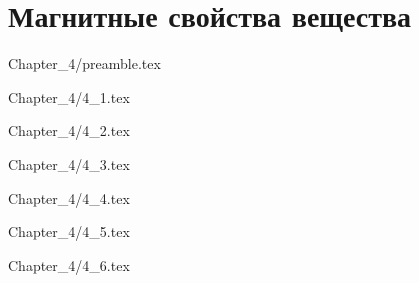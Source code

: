 \chapter{Магнитные свойства вещества}

 {Chapter_4/preamble.tex}

 {Chapter_4/4_1.tex}

 {Chapter_4/4_2.tex}

 {Chapter_4/4_3.tex}

 {Chapter_4/4_4.tex}

 {Chapter_4/4_5.tex}

 {Chapter_4/4_6.tex}
